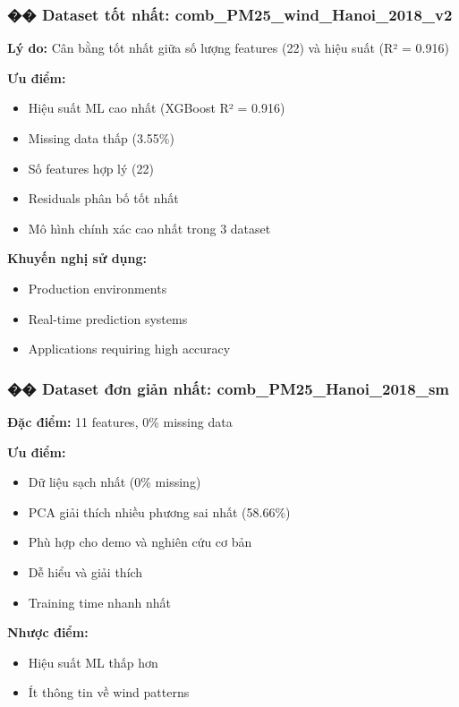 \documentclass[12pt,a4paper]{article}
\begin{document}
\subsubsection{�� Dataset tốt nhất: comb\_PM25\_wind\_Hanoi\_2018\_v2}

\textbf{Lý do:} Cân bằng tốt nhất giữa số lượng features (22) và hiệu suất (R² = 0.916)

\textbf{Ưu điểm:}
\begin{itemize}
    \item Hiệu suất ML cao nhất (XGBoost R² = 0.916)
    \item Missing data thấp (3.55\%)
    \item Số features hợp lý (22)
    \item Residuals phân bố tốt nhất
    \item Mô hình chính xác cao nhất trong 3 dataset
\end{itemize}

\textbf{Khuyến nghị sử dụng:}
\begin{itemize}
    \item Production environments
    \item Real-time prediction systems
    \item Applications requiring high accuracy
\end{itemize}

\subsubsection{�� Dataset đơn giản nhất: comb\_PM25\_Hanoi\_2018\_sm}

\textbf{Đặc điểm:} 11 features, 0\% missing data

\textbf{Ưu điểm:}
\begin{itemize}
    \item Dữ liệu sạch nhất (0\% missing)
    \item PCA giải thích nhiều phương sai nhất (58.66\%)
    \item Phù hợp cho demo và nghiên cứu cơ bản
    \item Dễ hiểu và giải thích
    \item Training time nhanh nhất
\end{itemize}

\textbf{Nhược điểm:}
\begin{itemize}
    \item Hiệu suất ML thấp hơn
    \item Ít thông tin về wind patterns
\end{itemize}
\end{document}

